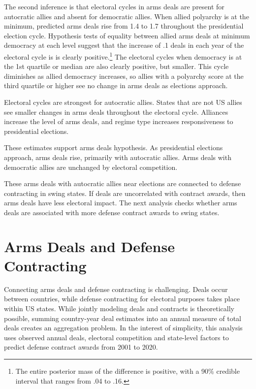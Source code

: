 \documentclass[12pt]{article}
\begin{document}
The second inference is that electoral cycles in arms deals are present for autocratic allies and absent for democratic allies.
When allied polyarchy is at the minimum, predicted arms deals rise from 1.4 to 1.7 throughout the presidential election cycle.
Hypothesis tests of equality between allied arms deals at minimum democracy at each level suggest that the increase of .1 deals in each year of the electoral cycle is is clearly positive.\footnote{The entire posterior mass of the difference is positive, with a 90\% credible interval that ranges from .04 to .16.}
The electoral cycles when democracy is at the 1st quartile or median are also clearly positive, but smaller.
This cycle diminishes as allied democracy increases, so allies with a polyarchy score at the third quartile or higher see no change in arms deals as elections approach.  


Electoral cycles are strongest for autocratic allies. 
States that are not US allies see smaller changes in arms deals throughout the electoral cycle. 
Alliances increase the level of arms deals, and regime type increases responsiveness to presidential elections. 


These estimates support arms deals hypothesis. 
As presidential elections approach, arms deals rise, primarily with autocratic allies. 
Arms deals with democratic allies are unchanged by electoral competition.


These arms deals with autocratic allies near elections are connected to defense contracting in swing states. 
If deals are uncorrelated with contract awards, then arms deals have less electoral impact. 
The next analysis checks whether arms deals are associated with more defense contract awards to swing states. 



\section{Arms Deals and Defense Contracting}


Connecting arms deals and defense contracting is challenging. 
Deals occur between countries, while defense contracting for electoral purposes takes place within US states.
While jointly modeling deals and contracts is theoretically possible, summing country-year deal estimates into an annual measure of total deals creates an aggregation problem.%
In the interest of simplicity, this analysis uses observed annual deals, electoral competition and state-level factors to predict defense contract awards from 2001 to 2020. 
\end{document}
